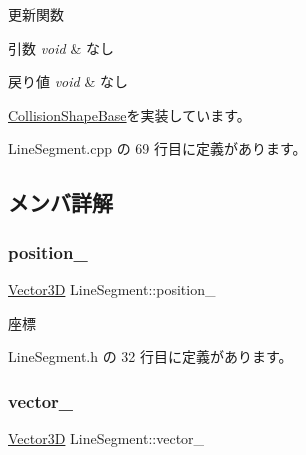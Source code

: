 更新関数 


\begin{DoxyParams}{引数}
{\em void} & なし \\
\hline
\end{DoxyParams}

\begin{DoxyRetVals}{戻り値}
{\em void} & なし \\
\hline
\end{DoxyRetVals}


\mbox{\hyperlink{class_collision_shape_base_a7aaa0f4de4e208f168f78e3445313929}{Collision\+Shape\+Base}}を実装しています。



 Line\+Segment.\+cpp の 69 行目に定義があります。



\subsection{メンバ詳解}
\mbox{\label{class_line_segment_a2b62cbe86bc97fccece2b098d83d643e}} 
\subsubsection{\texorpdfstring{position\+\_\+}{position\_}}
{\footnotesize\ttfamily \mbox{\hyperlink{class_vector3_d}{Vector3D}} Line\+Segment\+::position\+\_\+\hspace{0.3cm}{\ttfamily [private]}}



座標 



 Line\+Segment.\+h の 32 行目に定義があります。

\mbox{\label{class_line_segment_a8a0af480c7798ce5d9975dce984cae38}} 
\subsubsection{\texorpdfstring{vector\+\_\+}{vector\_}}
{\footnotesize\ttfamily \mbox{\hyperlink{class_vector3_d}{Vector3D}} Line\+Segment\+::vector\+\_\+\hspace{0.3cm}{\ttfamily [private]}}



